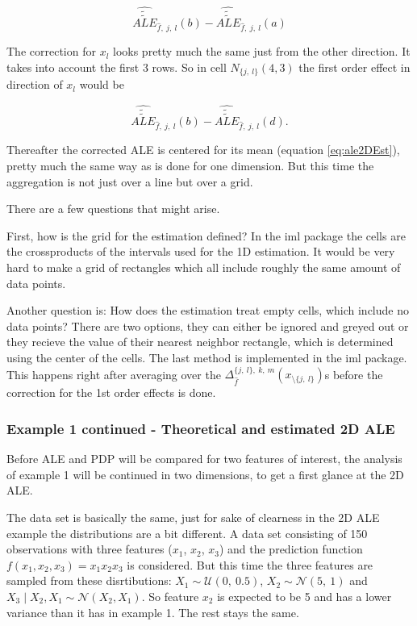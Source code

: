 \documentclass[
]{krantz}
\begin{document}
\[ \widehat{\widetilde{\widetilde{ALE}}}_{\hat{f},~j,~l}(b) - \widehat{\widetilde{\widetilde{ALE}}}_{\hat{f},~j,~l}(a)\]

The correction for \(x_l\) looks pretty much the same just from the other direction. It takes into account the first 3 rows. So in cell \(N_{\{j,~l\}}(4,3)\) the first order effect in direction of \(x_l\) would be

\[ \widehat{\widetilde{\widetilde{ALE}}}_{\hat{f},~j,~l}(b) - \widehat{\widetilde{\widetilde{ALE}}}_{\hat{f},~j,~l}(d). \]

Thereafter the corrected ALE is centered for its mean (equation \eqref{eq:ale2DEst}), pretty much the same way as is done for one dimension. But this time the aggregation is not just over a line but over a grid.

There are a few questions that might arise.

First, how is the grid for the estimation defined? In the iml package the cells are the crossproducts of the intervals used for the 1D estimation. It would be very hard to make a grid of rectangles which all include roughly the same amount of data points.

Another question is: How does the estimation treat empty cells, which include no data points? There are two options, they can either be ignored and greyed out or they recieve the value of their nearest neighbor rectangle, which is determined using the center of the cells. The last method is implemented in the iml package. This happens right after averaging over the \(\Delta_{\hat f}^{{\{j,~l\}}, ~k,~m} (x_{\setminus\{j,~l\}})\)s before the correction for the 1st order effects is done.

\hypertarget{example-1-continued---theoretical-and-estimated-2d-ale}{%
\subsubsection{Example 1 continued - Theoretical and estimated 2D ALE}\label{example-1-continued---theoretical-and-estimated-2d-ale}}

Before ALE and PDP will be compared for two features of interest, the analysis of example 1 will be continued in two dimensions, to get a first glance at the 2D ALE.

The data set is basically the same, just for sake of clearness in the 2D ALE example the distributions are a bit different.
A data set consisting of 150 observations with three features (\(x_1\), \(x_2\), \(x_3\)) and the prediction function \(f(x_1, x_2, x_3) = x_1 x_2 x_3\) is considered.
But this time the three features are sampled from these disrtibutions:
\(X_1 \sim \mathcal{U}(0,~0.5)\), \(X_2 \sim \mathcal{N}(5,~1)\) and \(X_3\mid X_2, X_1 \sim \mathcal{N}(X_2,X_1)\).
So feature \(x_2\) is expected to be 5 and has a lower variance than it has in example 1. The rest stays the same.
\end{document}

